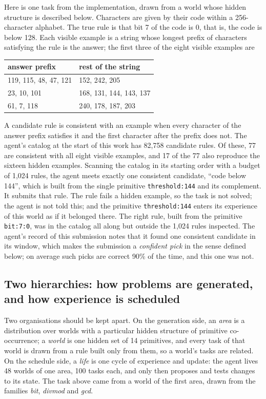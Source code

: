 \documentclass[11pt]{article}
\begin{document}
Here is one task from the implementation, drawn from a world whose hidden structure is described below. Characters are given by their code within a 256-character alphabet. The true rule is that bit 7 of the code is 0, that is, the code is below 128. Each visible example is a string whose longest prefix of characters satisfying the rule is the answer; the first three of the eight visible examples are

\begin{center}
\begin{tabular}{ll}
\toprule
answer prefix & rest of the string \\
\midrule
119, 115, 48, 47, 121 & 152, 242, 205 \\
23, 10, 101 & 168, 131, 144, 143, 137 \\
61, 7, 118 & 240, 178, 187, 203 \\
\bottomrule
\end{tabular}
\end{center}

A candidate rule is consistent with an example when every character of the answer prefix satisfies it and the first character after the prefix does not. The agent's catalog at the start of this work has 82,758 candidate rules. Of these, 77 are consistent with all eight visible examples, and 17 of the 77 also reproduce the sixteen hidden examples. Scanning the catalog in its starting order with a budget of 1,024 rules, the agent meets exactly one consistent candidate, ``code below 144'', which is built from the single primitive \texttt{threshold:144} and its complement. It submits that rule. The rule fails a hidden example, so the task is not solved; the agent is not told this; and the primitive \texttt{threshold:144} enters its experience of this world as if it belonged there. The right rule, built from the primitive \texttt{bit:7:0}, was in the catalog all along but outside the 1,024 rules inspected. The agent's record of this submission notes that it found one consistent candidate in its window, which makes the submission a \emph{confident pick} in the sense defined below; on average such picks are correct 90\% of the time, and this one was not.

\subsection{Two hierarchies: how problems are generated, and how experience is scheduled}

Two organisations should be kept apart. On the generation side, an \emph{area} is a distribution over worlds with a particular hidden structure of primitive co-occurrence; a \emph{world} is one hidden set of 14 primitives, and every task of that world is drawn from a rule built only from them, so a world's tasks are related. On the schedule side, a \emph{life} is one cycle of experience and update: the agent lives 48 worlds of one area, 100 tasks each, and only then proposes and tests changes to its state. The task above came from a world of the first area, drawn from the families \emph{bit}, \emph{divmod} and \emph{gcd}.
\end{document}
